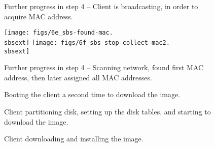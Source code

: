 \begin{figure}[h!]
  \begin{center}
    \centerline{
      }
    \caption{Further progress in step 4 -- Client is broadcasting, in
      order to acquire MAC address.}
    \label{fig:sbs-collect-broadcast} 
  \end{center}
\end{figure}

\begin{figure}[h!]
  \begin{center}
    \centerline{
      \texttt{[image: figs/6e\_sbs-found-mac.\\sbsext]}
      \hspace{\imghskip}
      \texttt{[image: figs/6f\_sbs-stop-collect-mac2.\\sbsext]}
      }
    \caption[Further progress in step 4 -- Assigning MACs to
      IPs]{Further progress in step 4 -- Scanning network, found first
        MAC address, then later assigned all MAC addresses.}
    \label{fig:sbs-setup-network2}
  \end{center}
\end{figure}


\begin{figure}[h!]
  \begin{center}
    \centerline{
      }
    \caption{Booting the client a second time to download the image.}
    \label{fig:sbs-install-boot}
  \end{center}
\end{figure}

\begin{figure}[h!]
  \begin{center}
    \centerline{
      }
    \caption{Client partitioning disk, setting up the disk tables, and
      starting to download the image.}
    \label{fig:sbs-install-diskpar}
  \end{center}
\end{figure}
  
\begin{figure}[h!]
  \begin{center}
    \centerline{
      }
    \caption{Client downloading and installing the image.}
    \label{fig:sbs-install-rsync}
  \end{center}
\end{figure}

